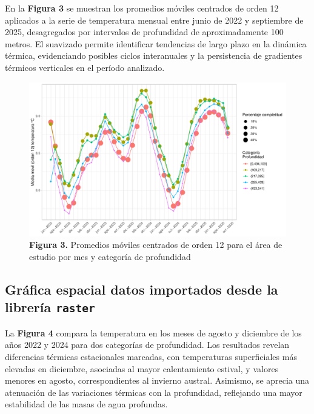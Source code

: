 \documentclass[
]{article}
\begin{document}
En la \textbf{Figura 3} se muestran los promedios móviles centrados de
orden 12 aplicados a la serie de temperatura mensual entre junio de 2022
y septiembre de 2025, desagregados por intervalos de profundidad de
aproximadamente 100 metros. El suavizado permite identificar tendencias
de largo plazo en la dinámica térmica, evidenciando posibles ciclos
interanuales y la persistencia de gradientes térmicos verticales en el
período analizado.

\begin{figure}[H]

{\centering \includegraphics{OHWe_JCSN_2025_files/figure-pdf/unnamed-chunk-14-1.pdf}

}

\caption{\textbf{Figura 3.} Promedios móviles centrados de orden 12 para
el área de estudio por mes y categoría de profundidad}

\end{figure}%

\subsection{\texorpdfstring{Gráfica espacial datos importados desde la
librería
\textbf{\texttt{raster}}}{Gráfica espacial datos importados desde la librería raster}}\label{gruxe1fica-espacial-datos-importados-desde-la-libreruxeda-raster}

La \textbf{Figura 4} compara la temperatura en los meses de agosto y
diciembre de los años 2022 y 2024 para dos categorías de profundidad.
Los resultados revelan diferencias térmicas estacionales marcadas, con
temperaturas superficiales más elevadas en diciembre, asociadas al mayor
calentamiento estival, y valores menores en agosto, correspondientes al
invierno austral. Asimismo, se aprecia una atenuación de las variaciones
térmicas con la profundidad, reflejando una mayor estabilidad de las
masas de agua profundas.
\end{document}
